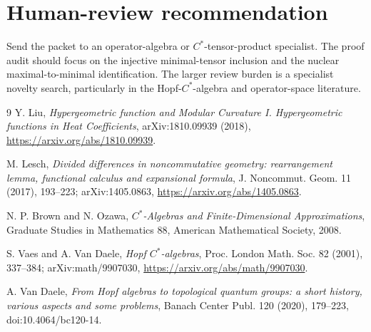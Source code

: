 \documentclass[11pt]{article}
\begin{document}
\section{Human-review recommendation}

Send the packet to an operator-algebra or $C^*$-tensor-product specialist.
The proof audit should focus on the injective minimal-tensor inclusion and the
nuclear maximal-to-minimal identification.  The larger review burden is a
specialist novelty search, particularly in the Hopf-$C^*$-algebra and
operator-space literature.

\begin{thebibliography}{9}
Y. Liu,
\emph{Hypergeometric function and Modular Curvature I. Hypergeometric
functions in Heat Coefficients}, arXiv:1810.09939 (2018),
\url{https://arxiv.org/abs/1810.09939}.

M. Lesch,
\emph{Divided differences in noncommutative geometry: rearrangement lemma,
functional calculus and expansional formula},
J. Noncommut. Geom. 11 (2017), 193--223; arXiv:1405.0863,
\url{https://arxiv.org/abs/1405.0863}.

N. P. Brown and N. Ozawa,
\emph{$C^*$-Algebras and Finite-Dimensional Approximations},
Graduate Studies in Mathematics 88, American Mathematical Society, 2008.

S. Vaes and A. Van Daele,
\emph{Hopf $C^*$-algebras},
Proc. London Math. Soc. 82 (2001), 337--384; arXiv:math/9907030,
\url{https://arxiv.org/abs/math/9907030}.

A. Van Daele,
\emph{From Hopf algebras to topological quantum groups: a short history,
various aspects and some problems},
Banach Center Publ. 120 (2020), 179--223,
doi:10.4064/bc120-14.
\end{thebibliography}
\end{document}
